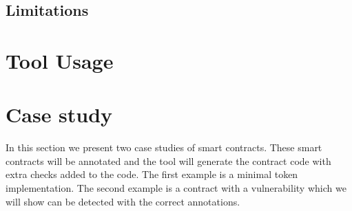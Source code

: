 \documentclass[a4paper]{article}
\begin{document}
\subsection{Limitations}

\section{Tool Usage}


\section{Case study}
In this section we present two case studies of smart contracts. These smart contracts will be annotated and the tool will generate the contract code with extra checks added to the code. The first example is a minimal token implementation. The second example is a contract with a vulnerability which we will show can be detected with the correct annotations.
\end{document}
